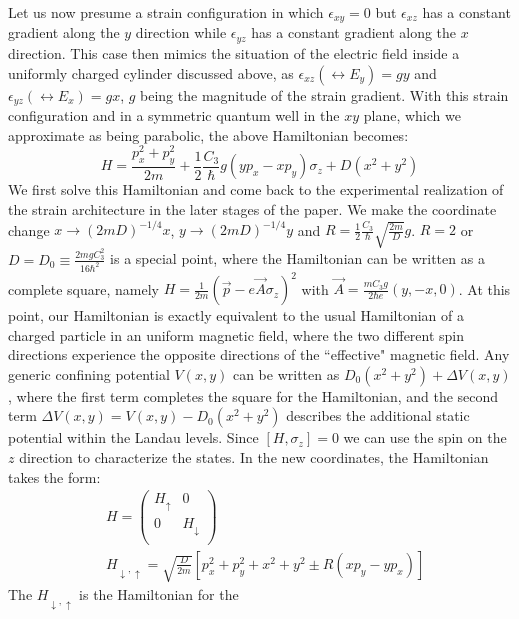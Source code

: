 \documentclass[prl,aps,amssymb,shownopacs,twocolumn]{revtex4}
\begin{document}
Let us now presume a strain configuration in which $\epsilon_{xy}
= 0$ but $\epsilon_{xz}$ has a constant gradient along the $y$
direction while $\epsilon_{yz}$ has a constant gradient along the
$x$ direction. This case then mimics the situation of the electric
field inside a uniformly charged cylinder discussed above, as
$\epsilon_{xz} (\leftrightarrow E_y) =g y$ and $\epsilon_{yz}
(\leftrightarrow E_x) = g x$, $g$ being the magnitude of the
strain gradient. With this strain configuration and in a symmetric
quantum well in the $xy$ plane, which we approximate as being
parabolic, the above Hamiltonian becomes:
\begin{equation}
H= \frac{p_x^2 + p_y^2}{2m} + \frac{1}{2} \frac{C_3}{\hbar}g (y p_x
- x  p_y)\sigma_z + D(x^2 + y^2)
\end{equation}
\noindent We first solve this Hamiltonian and come back to the
experimental realization of the strain architecture in the later
stages of the paper. We make the coordinate change $x \rightarrow
(2mD)^{-1/4} x$, $y \rightarrow (2mD)^{-1/4} y$ and $R =
\frac{1}{2} \frac{C_3}{\hbar} \sqrt{\frac{2m}{D}} g$. $R=2$ or
$D=D_0\equiv\frac{2mgC_3^2}{16\hbar^2}$ is a special point, where
the Hamiltonian can be written as a complete square, namely $H =
\frac{1}{2m} (\vec{p} - e \vec{A} \sigma_z)^2$ with ${\vec{A} =
\frac{m C_3 g}{2 \hbar e}(y, -x, 0)}$. At this point, our
Hamiltonian is exactly equivalent to the usual Hamiltonian of a
charged particle in an uniform magnetic field, where the two
different spin directions experience the opposite directions of
the ``effective" magnetic field. Any generic confining potential
$V(x,y)$ can be written as $D_0(x^2 + y^2) + \Delta V(x,y)$, where
the first term completes the square for the Hamiltonian, and the
second term $\Delta V(x,y)=V(x,y)-D_0(x^2 + y^2)$ describes the
additional static potential within the Landau levels. Since $[H,
\sigma_z] =0$ we can use the spin on the $z$ direction to
characterize the states. In the new coordinates, the Hamiltonian
takes the form:
 \begin{eqnarray}
& H = \left(%
\begin{array}{cc}
  H_{\uparrow} & 0 \\
  0 & H_{\downarrow} \\
\end{array}%
\right) \nonumber \\ & H_{ \downarrow , \uparrow} =
\sqrt{\frac{D}{2m}} [p_x^2 + p_y^2 + x^2+ y^2 \pm R(x p_y - y p_x)]
\end{eqnarray}
\noindent The $H_{ \downarrow, \uparrow}$ is the Hamiltonian for the
\end{document}
